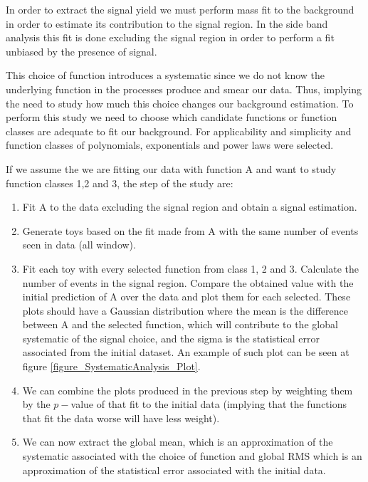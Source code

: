 \documentclass[%
reprint,
amsmath,
amssymb,
aps,
pra,
showkeys
]{revtex4-1}
\begin{document}
In order to extract the signal yield we must perform mass fit to the background in order to estimate its contribution 
to the signal region. In the side band analysis this fit is done excluding the signal region in order to perform a 
fit unbiased by the presence of signal.

This choice of function introduces a systematic since we do not know the underlying function in the processes produce 
and smear our data. Thus, implying the need to study how much this choice changes our background estimation.
To perform this study we need to choose which candidate functions or function classes are adequate to fit our 
background. For applicability and simplicity and function classes of polynomials, exponentials and power laws were 
selected.

If we assume the we are fitting our data with function A and want to study function classes 1,2 and 3, the step of 
the study are:
\begin{enumerate}
 \item Fit A to the data excluding the signal region and obtain a signal estimation.
 \item Generate toys based on the fit made from A with the same number of events seen in data (all window).
 \item Fit each toy with every selected function from class 1, 2 and 3. Calculate the number of events in the signal 
 region. Compare the obtained value with the initial prediction of A over the data and plot them for each selected. 
 These plots should have a Gaussian distribution where the mean is the difference between A and the selected function, 
 which will contribute to the global systematic of the signal choice, and the sigma is the statistical error associated 
 from the initial dataset. An example of such plot can be seen at figure \ref{figure_SystematicAnalysis_Plot}.
 \item We can combine the plots produced in the previous step by weighting them by the $p-$value of that fit to the 
 initial data (implying that the functions that fit the data worse will have less weight).
 \item We can now extract the global mean, which is an approximation of the systematic associated with the choice of 
 function and global RMS which is an approximation of the statistical error associated with the initial data.
\end{enumerate}
\end{document}
